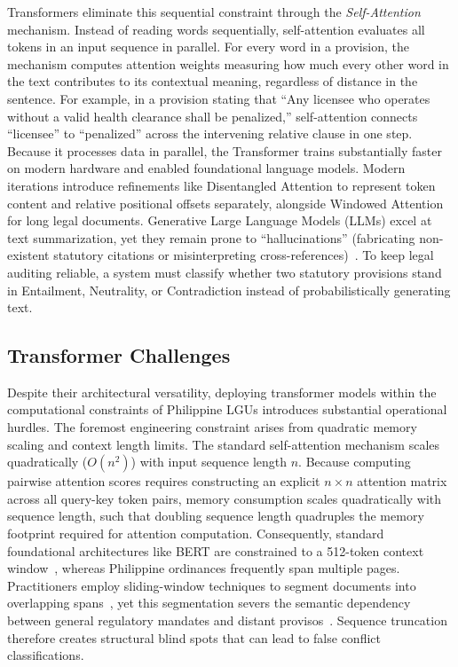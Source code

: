     Transformers eliminate this sequential constraint through the \textit{Self-Attention} mechanism. Instead of reading words sequentially, self-attention evaluates all tokens in an input sequence in parallel. For every word in a provision, the mechanism computes attention weights measuring how much every other word in the text contributes to its contextual meaning, regardless of distance in the sentence. For example, in a provision stating that ``Any licensee who operates without a valid health clearance shall be penalized,'' self-attention connects ``licensee'' to ``penalized'' across the intervening relative clause in one step. Because it processes data in parallel, the Transformer trains substantially faster on modern hardware and enabled foundational language models. Modern iterations introduce refinements like Disentangled Attention to represent token content and relative positional offsets separately, alongside Windowed Attention for long legal documents. Generative Large Language Models (LLMs) excel at text summarization, yet they remain prone to ``hallucinations'' (fabricating non-existent statutory citations or misinterpreting cross-references)~\cite{deroy2023how}. To keep legal auditing reliable, a system must classify whether two statutory provisions stand in Entailment, Neutrality, or Contradiction instead of probabilistically generating text.

    \subsection{Transformer Challenges}
    Despite their architectural versatility, deploying transformer models within the computational constraints of Philippine LGUs introduces substantial operational hurdles. The foremost engineering constraint arises from quadratic memory scaling and context length limits. The standard self-attention mechanism scales quadratically ($O(n^2)$) with input sequence length $n$. Because computing pairwise attention scores requires constructing an explicit $n \times n$ attention matrix across all query-key token pairs, memory consumption scales quadratically with sequence length, such that doubling sequence length quadruples the memory footprint required for attention computation. Consequently, standard foundational architectures like BERT are constrained to a 512-token context window~\cite{devlin2019bert}, whereas Philippine ordinances frequently span multiple pages. Practitioners employ sliding-window techniques to segment documents into overlapping spans~\cite{anand2020explainable, seo2025sliding}, yet this segmentation severs the semantic dependency between general regulatory mandates and distant provisos~\cite{savelka2021discovering}. Sequence truncation therefore creates structural blind spots that can lead to false conflict classifications.

